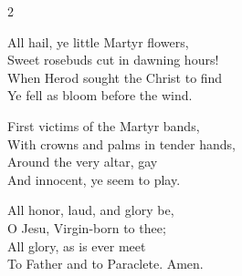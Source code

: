 \begin{multicols}{2}
\raggedcolumns
\begin{enpars}
All hail, ye little Martyr flowers,\\
Sweet rosebuds cut in dawning hours!\\
When Herod sought the Christ to find\\
Ye fell as bloom before the wind.

First victims of the Martyr bands,\\
With crowns and palms in tender hands,\\
Around the very altar, gay\\
And innocent, ye seem to play.

All honor, laud, and glory be,\\
O Jesu, Virgin-born to thee;\\
All glory, as is ever meet\\
To Father and to Paraclete.
Amen.\end{enpars}\end{multicols}